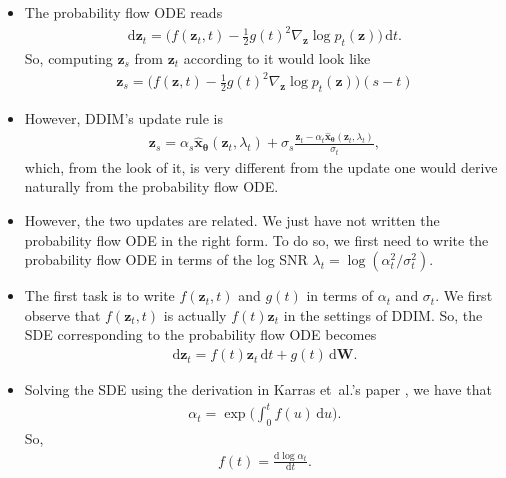 \documentclass[10pt]{article}
\newcommand{\dee}{\mathrm{d}}
\newcommand{\ve}[1]{\mathbf{#1}}
\newcommand{\ves}[1]{\boldsymbol{#1}}
\newcommand{\etal}{{et~al.}}
\begin{document}
\begin{itemize}
  \item The probability flow ODE \cite{Song:2021} reads
  \begin{align*}
    \dee\ve{z}_t = \bigg( f(\ve{z}_t,t) - \frac{1}{2}g(t)^2 \nabla_{\ve{z}} \log p_t(\ve{z}) \bigg)\, \dee t.
  \end{align*}
  So, computing $\ve{z}_s$ from $\ve{z}_t$ according to it would look like
  \begin{align*}
    \ve{z}_s = \bigg( f(\ve{z},t) - \frac{1}{2}g(t)^2 \nabla_{\ve{z}} \log p_t(\ve{z}) \bigg) (s - t)
  \end{align*}

  \item However, DDIM's update rule is
  \begin{align*}
    \ve{z}_s = \alpha_s \hat{\ve{x}}_{\ves{\theta}}(\ve{z}_t, \lambda_t) + \sigma_s \frac{\ve{z}_t - \alpha_t \hat{\ve{x}}_{\ves{\theta}}(\ve{z}_t, \lambda_t)}{\sigma_t},
  \end{align*}
  which, from the look of it, is very different from the update one would derive naturally from the probability flow ODE.

  \item However, the two updates are related. We just have not written the probability flow ODE in the right form. To do so, we first need to write the probability flow ODE in terms of the log SNR $\lambda_t = \log (\alpha_t^2 / \sigma_t^2)$.
  
  \item The first task is to write $f(\ve{z}_t, t)$ and $g(t)$ in terms of $\alpha_t$ and $\sigma_t$. We first observe that $f(\ve{z}_t, t)$ is actually $f(t)\ve{z}_t$ in the settings of DDIM. So, the SDE corresponding to the probability flow ODE becomes
  \begin{align*}
    \dee\ve{z}_t = f(t)\ve{z}_t\, \dee t + g(t)\, \dee\ve{W}.
  \end{align*}
  
  \item Solving the SDE using the derivation in Karras \etal's paper \cite{Karras:2022}, we have that
  \begin{align*}
    \alpha_t = \exp\bigg( \int_0^t f(u)\, \dee u\bigg).
  \end{align*}
  So,
  \begin{align*}
    f(t) = \frac{\dee \log \alpha_t}{\dee t}.
  \end{align*}
  

\end{itemize}
\end{document}
